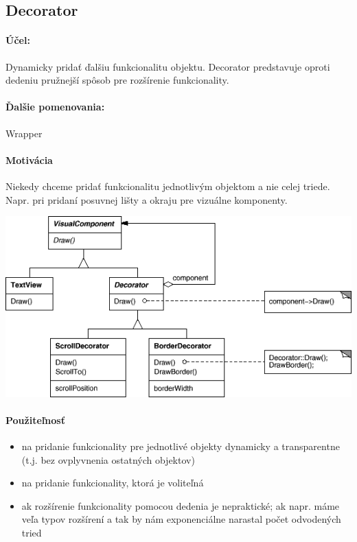 	\subsection{Decorator}
		
		\paragraph{Účel: }
			Dynamicky pridať ďalšiu funkcionalitu objektu. Decorator predstavuje oproti dedeniu pružnejší spôsob pre rozšírenie funkcionality.

		\paragraph{Ďalšie pomenovania: }
				Wrapper

		\paragraph{Motivácia}
			Niekedy chceme pridať funkcionalitu jednotlivým objektom a nie celej triede. Napr. pri pridaní posuvnej lišty a okraju pre vizuálne komponenty.

			\includegraphics[width=.9\textwidth]{images/programovanie/decorator1}

		\paragraph{Použiteľnosť}
			\begin{itemize}
				\item na pridanie funkcionality pre jednotlivé objekty dynamicky a transparentne (t.j. bez ovplyvnenia ostatných objektov)
				\item na pridanie funkcionality, ktorá je voliteľná
				\item ak rozšírenie funkcionality pomocou dedenia je nepraktické; ak napr. máme veľa typov rozšírení a tak by nám exponenciálne narastal počet odvodených tried
			\end{itemize}
